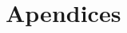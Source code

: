 \documentclass[11pt,a4paper,spanish]{book}
\numberwithin{equation}{chapter}
\numberwithin{figure}{chapter}
\begin{document}




\newpage





\appendix
\chapter{Apendices}
\end{document}
